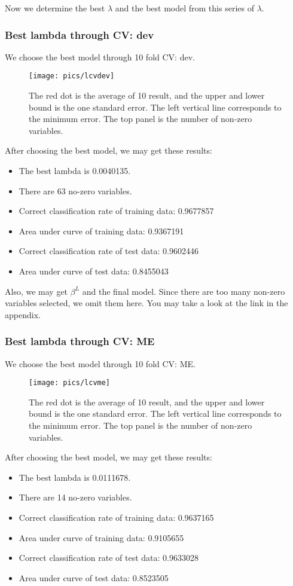 \documentclass[]{article}
\begin{document}
Now we determine the best $ \lambda $ and the best model from this series of $ \lambda $.

\subsubsection{Best lambda through CV: dev}
We choose the best model through 10 fold CV: dev.
\begin{figure}[H]
	\centering
	\texttt{[image: pics/lcvdev]}
	\caption{The red dot is the average of 10 result, and the upper and lower bound is the one standard error. The left vertical line corresponds to the minimum error. The top panel is the number of non-zero variables.\label{fig=lcvdev}}
\end{figure}

After choosing the best model, we may get these results:
\begin{itemize}
	\item The best lambda is 0.0040135.
	\item There are 63 no-zero variables.
	\item Correct classification rate of training data: 0.9677857
	\item Area under curve of training data: 0.9367191
	\item Correct classification rate of test data: 0.9602446
	\item Area under curve of test data: 0.8455043
\end{itemize}
 
Also, we may get $ \beta^L $ and the final model. Since there are too many non-zero variables selected, we omit them here. You may take a look at the link in the appendix.

\subsubsection{Best lambda through CV: ME}
We choose the best model through 10 fold CV: ME.
\begin{figure}[H]
	\centering
	\texttt{[image: pics/lcvme]}
	\caption{The red dot is the average of 10 result, and the upper and lower bound is the one standard error. The left vertical line corresponds to the minimum error. The top panel is the number of non-zero variables.\label{fig=lcvme}}
\end{figure}

After choosing the best model, we may get these results:
\begin{itemize}
	\item The best lambda is 0.0111678.
	\item There are 14 no-zero variables.
	\item Correct classification rate of training data: 0.9637165
	\item Area under curve of training data: 0.9105655
	\item Correct classification rate of test data: 0.9633028
	\item Area under curve of test data: 0.8523505
\end{itemize}
\end{document}
